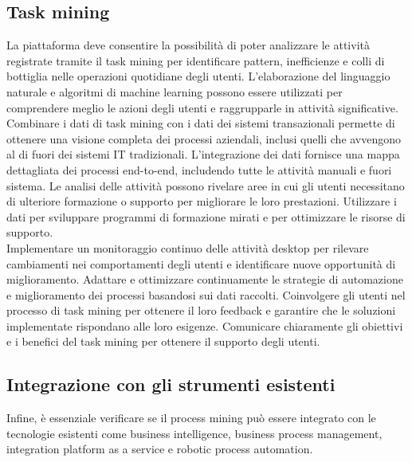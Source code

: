 \documentclass{article}
\begin{document}
\subsection{Task mining}
La piattaforma deve consentire la possibilità di poter analizzare le attività registrate tramite il task mining per identificare pattern, inefficienze e colli di bottiglia nelle operazioni quotidiane degli utenti. L'elaborazione del linguaggio naturale e algoritmi di machine learning possono essere utilizzati per comprendere meglio le azioni degli utenti e raggrupparle in attività significative. Combinare i dati di task mining con i dati dei sistemi transazionali permette di ottenere una visione completa dei processi aziendali, inclusi quelli che avvengono al di fuori dei sistemi IT tradizionali. L'integrazione dei dati fornisce una mappa dettagliata dei processi end-to-end, includendo tutte le attività manuali e fuori sistema. Le analisi delle attività possono rivelare aree in cui gli utenti necessitano di ulteriore formazione o supporto per migliorare le loro prestazioni. Utilizzare i dati per sviluppare programmi di formazione mirati e per ottimizzare le risorse di supporto.\\
Implementare un monitoraggio continuo delle attività desktop per rilevare cambiamenti nei comportamenti degli utenti e identificare nuove opportunità di miglioramento. Adattare e ottimizzare continuamente le strategie di automazione e miglioramento dei processi basandosi sui dati raccolti. Coinvolgere gli utenti nel processo di task mining per ottenere il loro feedback e garantire che le soluzioni implementate rispondano alle loro esigenze. Comunicare chiaramente gli obiettivi e i benefici del task mining per ottenere il supporto degli utenti.

\subsection{Integrazione con gli strumenti esistenti}
Infine, è essenziale verificare se il process mining può essere integrato con le tecnologie esistenti come business intelligence, business process management, integration platform as a service e robotic process automation.
\end{document}
